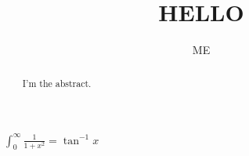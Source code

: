 \documentclass{ximera}
\title{HELLO}
\author{ME}
\begin{document}
\begin{abstract}

I'm the abstract.
\end{abstract}
\maketitle

$\int_0^{\infty}\frac{1}{1+x^2}=\tan^{-1}x$
\end{document}
